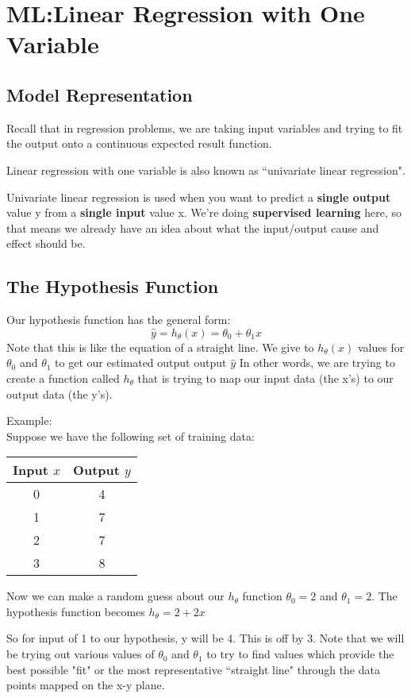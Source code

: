 \section{ML:Linear Regression with One Variable}
\subsection{Model Representation}
Recall that in regression problems, we are taking input variables and trying to fit the output onto a continuous expected result function.

Linear regression with one variable is also known as ``univariate linear regression".

Univariate linear regression is used when you want to predict a {\bf single output} value y from a {\bf single input} value x. We're doing {\bf supervised learning} here, so that means we already have an idea about what the input/output cause and effect should be.
\subsection{The Hypothesis Function}
Our hypothesis function has the general form:
\begin{equation}
\hat{y} = h_\theta(x) = \theta_0 + \theta_1 x
\end{equation}
Note that this is like the equation of a straight line. We give to $h_\theta(x)$ values for $\theta_0 $ and $\theta_1$ to get our estimated output  output $\hat{y}$ In other words, we are trying to create a function called $h_\theta$ that is trying to map our input data (the x's) to our output data (the y's).

Example:\\
Suppose we have the following set of training data:
\begin{center}
\begin{tabular}{|c|c|}
\hline 
{\bf Input $x$} & {\bf Output $y$} \\ 
\hline 
0 & 4 \\ 
\hline 
1 & 7 \\ 
\hline 
2 & 7 \\ 
\hline 
3 & 8 \\ 
\hline 
\end{tabular}
\end{center} 
Now we can make a random guess about our $h_\theta$ function $\theta_0 = 2$ and $\theta_1 = 2$. The hypothesis function becomes $h_\theta = 2 + 2x$

So for input of 1 to our hypothesis, y will be 4. This is off by 3. Note that we will be trying out various values of $\theta_0$ and $\theta_1$ to try to find values which provide the best possible "fit" or the most representative ``straight line" through the data points mapped on the x-y plane.


